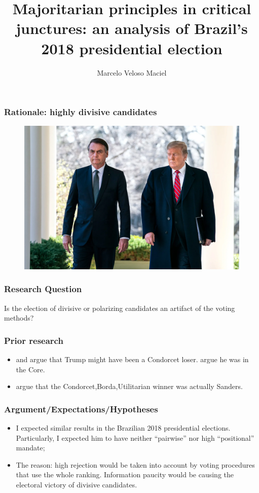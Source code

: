 \documentclass{beamer}
\title{Majoritarian principles in critical junctures: an analysis of Brazil's
  2018 presidential election}
\date{}
\author{Marcelo Veloso Maciel}
\institute{University of California, Irvine}
\begin{document}
\maketitle

\begin{frame}
\frametitle{Rationale: highly divisive candidates}
  \begin{figure}[H] \centering \includegraphics[width=\textwidth]{./trumpolnaro.png}
 \end{figure}
\end{frame}

\begin{frame}
  \frametitle{Research Question }
  Is the election of divisive or polarizing candidates an artifact of the voting
  methods?
\end{frame}

\begin{frame}
  \frametitle{Prior research}
  \begin{itemize}
    \item \textcite{potthoff2021condorcet} and \textcite{kurrild2018trump} argue
          that Trump might have been a Condorcet loser. \textcite{woon2020trump}
          argue he was in the Core.
    \item \textcite{igersheim22_compar_votin_method} argue that the Condorcet,Borda,Utilitarian winner was actually Sanders.
  \end{itemize}
\end{frame}

\begin{frame}
  \frametitle{Argument/Expectations/Hypotheses}
  \begin{itemize}
    \item I expected similar results in the Brazilian 2018 presidential
          elections. Particularly, I expected him to have neither ``pairwise''
          nor high ``positional'' mandate;
    \item The reason: high rejection would be taken into account by voting
          procedures that use the whole ranking. Information paucity would be
          causing the electoral victory of divisive candidates.
  \end{itemize}
\end{frame}
\end{document}
